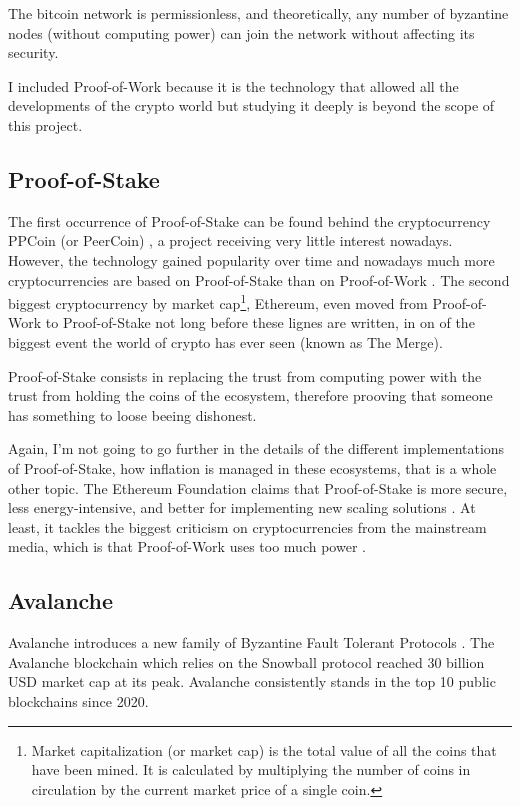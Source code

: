 \documentclass[11pt, twocolumn]{article}
\begin{document}
The bitcoin network is permissionless, and theoretically, any number of byzantine nodes (without computing power) can join the network without affecting its security.

I included Proof-of-Work because it is the technology that allowed all the developments of the crypto world but studying it deeply is beyond the scope of this project.



\subsection{Proof-of-Stake}
The first occurrence of Proof-of-Stake can be found behind the cryptocurrency PPCoin (or PeerCoin) \cite{ppcoin}, a project receiving very little interest nowadays. However, the technology gained popularity over time and nowadays much more cryptocurrencies are based on Proof-of-Stake than on Proof-of-Work \cite{coinmarketcap}. 
The second biggest cryptocurrency by market cap\footnote{Market capitalization (or market cap) is the total value of all the coins that have been mined. It is calculated by multiplying the number of coins in circulation by the current market price of a single coin.}, Ethereum, even moved from Proof-of-Work to Proof-of-Stake not long before these lignes are written, in on of the biggest event the world of crypto has ever seen (known as The Merge).

Proof-of-Stake consists in replacing the trust from computing power with the trust from holding the coins of the ecosystem, therefore prooving that someone has something to loose beeing dishonest.

Again, I'm not going to go further in the details of the different implementations of Proof-of-Stake, how inflation is managed in these ecosystems, that is a whole other topic. The Ethereum Foundation claims that Proof-of-Stake is more secure, less energy-intensive, and better for implementing new scaling solutions \cite{ethereum}. At least, it tackles the biggest criticism on cryptocurrencies from the mainstream media, which is that Proof-of-Work uses too much power \cite{bitcoinUse}.


\subsection{Avalanche}

Avalanche introduces a new family of Byzantine Fault Tolerant Protocols \cite{snowprotocol}. The Avalanche blockchain which relies on the Snowball protocol reached 30 billion USD market cap at its peak. Avalanche consistently stands in the top 10 public blockchains since 2020.
\end{document}
